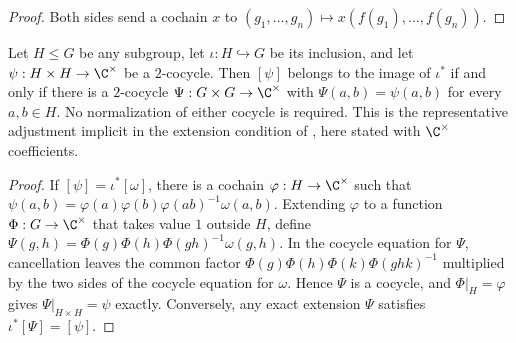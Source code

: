 \begin{proof}\leanok
    Both sides send a cochain $x$ to $(g_1,\dots,g_n)\mapsto x(f(g_1),\dots,f(g_n))$.
\end{proof}

\begin{lemma}
    \label{thm:mpug_h2_exact_extension}
    \leanok
    Let $H\le G$ be any subgroup, let $\iota:H\hookrightarrow G$ be its
    inclusion, and let $\psi:H\times H\to\C^\times$ be a $2$-cocycle.
    Then $[\psi]$ belongs to the image of $\iota^*$ if and only if there is
    a $2$-cocycle $\Psi:G\times G\to\C^\times$ with
    $\Psi(a,b)=\psi(a,b)$ for every $a,b\in H$.
    No normalization of either cocycle is required.
    This is the representative adjustment implicit in the extension
    condition of \cite[lines~7042--7064]{FrancoRubio2025MPUGauging},
    here stated with $\C^\times$ coefficients.
\end{lemma}

\begin{proof}\leanok
    If $[\psi]=\iota^*[\omega]$, there is a cochain
    $\varphi:H\to\C^\times$ such that
    $\psi(a,b)=\varphi(a)\varphi(b)\varphi(ab)^{-1}\omega(a,b)$.
    Extending $\varphi$ to a function $\Phi:G\to\C^\times$ that takes value $1$
    outside $H$, define
    $\Psi(g,h)=\Phi(g)\Phi(h)\Phi(gh)^{-1}\omega(g,h)$.
    In the cocycle equation for $\Psi$, cancellation leaves the common
    factor $\Phi(g)\Phi(h)\Phi(k)\Phi(ghk)^{-1}$ multiplied by the two sides
    of the cocycle equation for $\omega$. Hence $\Psi$ is a cocycle, and
    $\Phi|_H=\varphi$ gives $\Psi|_{H\times H}=\psi$ exactly.
    Conversely, any exact extension $\Psi$ satisfies
    $\iota^*[\Psi]=[\psi]$.
\end{proof}

